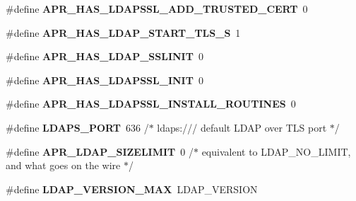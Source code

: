 \begin{DoxyCompactItemize}
\item 
\hypertarget{group___a_p_r___util___l_d_a_p_gab69231519b893f3dc23857e7aa4b65ad}{\#define {\bfseries A\-P\-R\-\_\-\-H\-A\-S\-\_\-\-L\-D\-A\-P\-S\-S\-L\-\_\-\-A\-D\-D\-\_\-\-T\-R\-U\-S\-T\-E\-D\-\_\-\-C\-E\-R\-T}~0}\label{group___a_p_r___util___l_d_a_p_gab69231519b893f3dc23857e7aa4b65ad}

\item 
\hypertarget{group___a_p_r___util___l_d_a_p_ga630a8cfea69448d4a4d882e099ae4d89}{\#define {\bfseries A\-P\-R\-\_\-\-H\-A\-S\-\_\-\-L\-D\-A\-P\-\_\-\-S\-T\-A\-R\-T\-\_\-\-T\-L\-S\-\_\-\-S}~1}\label{group___a_p_r___util___l_d_a_p_ga630a8cfea69448d4a4d882e099ae4d89}

\item 
\hypertarget{group___a_p_r___util___l_d_a_p_gadb27050178c600180c2a63bdedf88c02}{\#define {\bfseries A\-P\-R\-\_\-\-H\-A\-S\-\_\-\-L\-D\-A\-P\-\_\-\-S\-S\-L\-I\-N\-I\-T}~0}\label{group___a_p_r___util___l_d_a_p_gadb27050178c600180c2a63bdedf88c02}

\item 
\hypertarget{group___a_p_r___util___l_d_a_p_ga463efdc777a997776dd968557e7dac00}{\#define {\bfseries A\-P\-R\-\_\-\-H\-A\-S\-\_\-\-L\-D\-A\-P\-S\-S\-L\-\_\-\-I\-N\-I\-T}~0}\label{group___a_p_r___util___l_d_a_p_ga463efdc777a997776dd968557e7dac00}

\item 
\hypertarget{group___a_p_r___util___l_d_a_p_gaa64b2ce53dea5bcbc53e9b162c85f55d}{\#define {\bfseries A\-P\-R\-\_\-\-H\-A\-S\-\_\-\-L\-D\-A\-P\-S\-S\-L\-\_\-\-I\-N\-S\-T\-A\-L\-L\-\_\-\-R\-O\-U\-T\-I\-N\-E\-S}~0}\label{group___a_p_r___util___l_d_a_p_gaa64b2ce53dea5bcbc53e9b162c85f55d}

\item 
\hypertarget{group___a_p_r___util___l_d_a_p_ga4df3832839553f7b92d0844d0b8d84b6}{\#define {\bfseries L\-D\-A\-P\-S\-\_\-\-P\-O\-R\-T}~636  /$\ast$ ldaps\-:/// default L\-D\-A\-P over T\-L\-S port $\ast$/}\label{group___a_p_r___util___l_d_a_p_ga4df3832839553f7b92d0844d0b8d84b6}

\item 
\hypertarget{group___a_p_r___util___l_d_a_p_ga390f8d97d0456ecdb8d41fb1568f142f}{\#define {\bfseries A\-P\-R\-\_\-\-L\-D\-A\-P\-\_\-\-S\-I\-Z\-E\-L\-I\-M\-I\-T}~0 /$\ast$ equivalent to L\-D\-A\-P\-\_\-\-N\-O\-\_\-\-L\-I\-M\-I\-T, and what goes on the wire $\ast$/}\label{group___a_p_r___util___l_d_a_p_ga390f8d97d0456ecdb8d41fb1568f142f}

\item 
\hypertarget{group___a_p_r___util___l_d_a_p_ga903ddd466b7680a770ed66788232e37c}{\#define {\bfseries L\-D\-A\-P\-\_\-\-V\-E\-R\-S\-I\-O\-N\-\_\-\-M\-A\-X}~L\-D\-A\-P\-\_\-\-V\-E\-R\-S\-I\-O\-N}\label{group___a_p_r___util___l_d_a_p_ga903ddd466b7680a770ed66788232e37c}


\end{DoxyCompactItemize}
